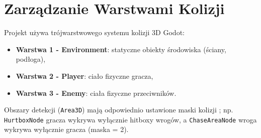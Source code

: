 \section{Zarządzanie Warstwami Kolizji}

Projekt używa trójwarstwowego systemu kolizji 3D Godot:
\begin{itemize}
    \item \textbf{Warstwa 1 - Environment}: statyczne obiekty środowiska (ściany, podłoga),
    \item \textbf{Warstwa 2 - Player}: ciało fizyczne gracza,
    \item \textbf{Warstwa 3 - Enemy}: ciała fizyczne przeciwników.
\end{itemize}

Obszary detekcji (\texttt{Area3D}) mają odpowiednio ustawione maski kolizji \cite{godot4docs}; np. \texttt{HurtboxNode} gracza wykrywa wyłącznie hitboxy wrogów, a \texttt{ChaseAreaNode} wroga wykrywa wyłącznie gracza (maska = 2).

